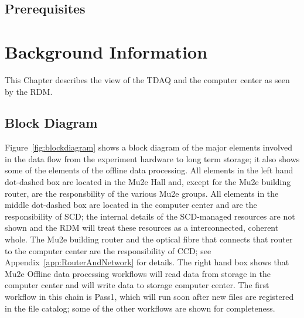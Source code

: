 \section{Prerequisites}


\chapter{Background Information}
\label{chap:BackgroundInfo}
This Chapter describes the view of the TDAQ and the computer center as seen by the RDM.

\section{Block Diagram}
\label{sec:BlockDiagram}

Figure~\ref{fig:blockdiagram} shows a block diagram of the major elements involved
in the data flow from the experiment hardware to long term storage; it also shows
some of the elements of the offline data processing.
All elements in the left hand dot-dashed box are located in the Mu2e Hall
and, except for the Mu2e building router, are the responsbility of the various Mu2e groups.
All elements in the middle dot-dashed box are located in the computer center
and are the responsibility of SCD; the internal details of the SCD-managed resources
are not shown and the RDM will treat these resources as a interconnected, coherent whole.
The Mu2e building router and the optical fibre that connects that router
to the computer center are the responsibility of CCD;
see Appendix~\ref{app:RouterAndNetwork} for details.
The right hand box shows that Mu2e Offline data processing workflows
will read data from storage in the computer center
and will write data to storage computer center.
The first workflow in this chain is Pass1, which will run soon after new files
are registered in the file catalog;
some of the other workflows are shown for completeness.

